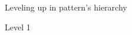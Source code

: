 \documentclass[preview]{standalone}
\begin{document}
\begin{center}
Leveling up in pattern's hierarchy
    
    Level 1
\end{center}
\end{document}
